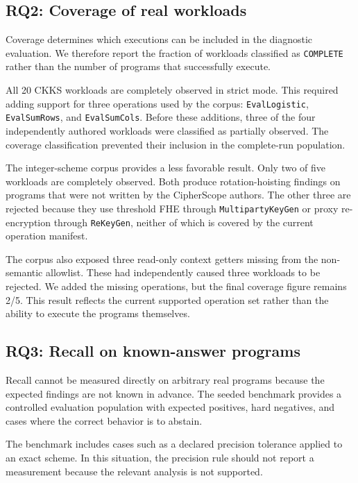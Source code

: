 \documentclass[pdflatex,sn-basic,Numbered,iicol]{sn-jnl}
\begin{document}
\subsection{RQ2: Coverage of real workloads}
\label{sec:rq2}

Coverage determines which executions can be included in the diagnostic
evaluation. We therefore report the fraction of workloads classified as
\texttt{COMPLETE} rather than the number of programs that successfully
execute.

All 20 CKKS workloads are completely observed in strict mode. This required
adding support for three operations used by the corpus:
\texttt{EvalLogistic}, \texttt{EvalSumRows}, and \texttt{EvalSumCols}. Before
these additions, three of the four independently authored workloads were
classified as partially observed. The coverage classification prevented their
inclusion in the complete-run population.

The integer-scheme corpus provides a less favorable result. Only two of five
workloads are completely observed. Both produce rotation-hoisting findings on
programs that were not written by the CipherScope authors. The other three are
rejected because they use threshold FHE through \texttt{MultipartyKeyGen} or
proxy re-encryption through \texttt{ReKeyGen}, neither of which is covered by
the current operation manifest.

The corpus also exposed three read-only context getters missing from the
non-semantic allowlist. These had independently caused three workloads to be
rejected. We added the missing operations, but the final coverage figure
remains 2/5. This result reflects the current supported operation set rather
than the ability to execute the programs themselves.

\subsection{RQ3: Recall on known-answer programs}
\label{sec:rq3}

Recall cannot be measured directly on arbitrary real programs because the
expected findings are not known in advance. The seeded benchmark provides a
controlled evaluation population with expected positives, hard negatives, and
cases where the correct behavior is to abstain.

The benchmark includes cases such as a declared precision tolerance applied to
an exact scheme. In this situation, the precision rule should not report a
measurement because the relevant analysis is not supported.
\end{document}
